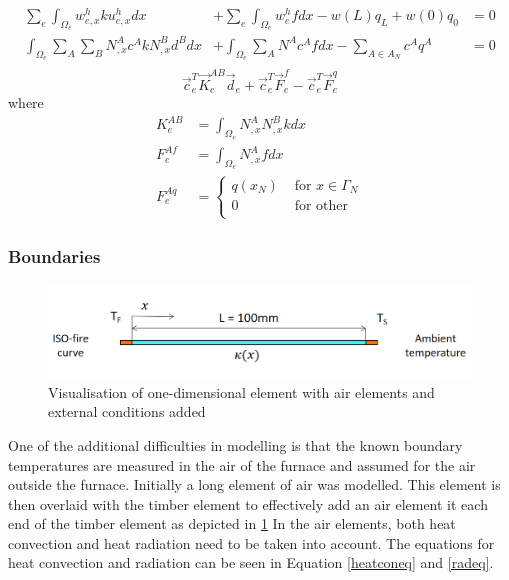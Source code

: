 	\begin{equation}
	\label{heateq4}
	\begin{aligned}
	\sum_e \int_{\Omega_e} w_{e,x}^h k  u_{e,x}^h dx &+ \sum_e \int_{\Omega_e} w_e^h f dx - w(L)q_L + w(0)q_0 &= 0\\
	\int_{\Omega_e} \sum_A \sum_B N_{,x}^A c^A k N_{,x}^B d^B dx  &+ \int_{\Omega_e} \sum_{A} N^A c^A f dx - \sum_{A\in A_N} c^A q^A &= 0\\
	\end{aligned}
	\end{equation}
	\begin{equation}
	\label{heateq5}
	\vec{c}_e^T \vec{K}_e^{AB} \vec{d}_e + \vec{c}_e^T \vec{F}_e^f -\vec{c}_e^T \vec{F}_e^q
	\end{equation}
	where
	\begin{equation*}
	\begin{aligned}
	K_e^{AB} &= \int_{\Omega_e}N_{,x}^AN_{,x}^B k dx\\
	F_e^{Af} &= \int_{\Omega_e}N_{,x}^A f dx\\
	F_e^{Aq} &= \begin{cases} q(x_N) &\text{ for } x \in \Gamma_N\\0 &\text{ for other }\\
	\end{cases}
	\end{aligned}
	\end{equation*}
	
	\subsubsection{Boundaries}
	\begin{figure}[H]\label{airelmfig}
	\centering
	\includegraphics[width = 0.75\linewidth]{figures/fem_fire_sketch.png}
	\caption{Visualisation of one-dimensional element with air elements and external conditions added}
	\end{figure}
	
	One of the additional difficulties in modelling is that the known boundary temperatures are measured in the air of the furnace and assumed for the air outside the furnace.
	Initially a long element of air was modelled.
	This element is then overlaid with the timber element to effectively add an air element it each end of the timber element as depicted in \ref{airelmfig}
	In the air elements, both heat convection and heat radiation need to be taken into account.
	The equations for heat convection and radiation can be seen in Equation \ref{heatconeq} and \ref{radeq}.
	
